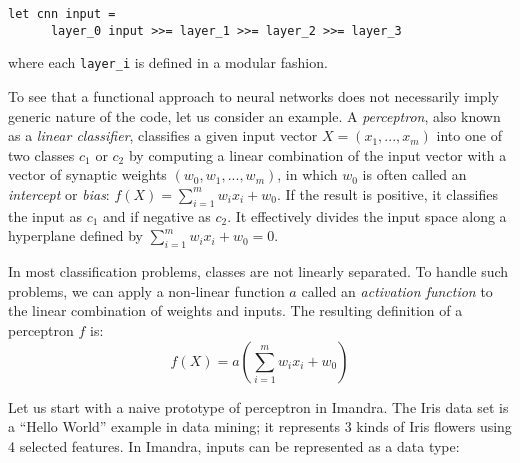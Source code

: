 \documentclass[runningheads]{llncs}
\begin{document}
\begin{lstlisting}[language=caml, label={lst:model}]
  let cnn input =
      layer_0 input >>= layer_1 >>= layer_2 >>= layer_3
\end{lstlisting}

where each \lstinline?layer_i? is defined in a modular fashion. 


 To see that a functional approach to neural networks does not necessarily imply generic nature of the code, 
let us consider an example. 
A \emph{perceptron}, also known as a \emph{linear classifier}, classifies a given input vector $X = (x_1, ..., x_m)$ into one of two classes $c_1$ or $c_2$ by computing a linear combination of the input vector with a vector of synaptic weights $(w_0, w_1, ..., w_m)$, in which $w_0$ is often called an \emph{intercept} or \emph{bias}: 
	$ f(X) = 	\sum_{i=1}^{m}w_ix_i + w_0 $.
If the result is positive, it classifies the input as $c_1$ and if negative as $c_2$. It effectively divides the input space along a hyperplane defined by
$\sum_{i=1}^{m}w_ix_i + w_0 = 0$. 



In most classification problems, classes are not linearly separated. To handle such problems, we can apply a non-linear function $a$ called an \textit{activation function} to the linear combination of weights and inputs. The resulting definition of a perceptron $f$ is:
\begin{equation}\label{eq:perceptron}
	f(X) = a\left(\sum_{i=1}^{m}w_ix_i + w_0\right)
      \end{equation}

     Let us start with a naive prototype of perceptron in Imandra.  The Iris data set is a ``Hello World'' example in data mining; it represents 3 kinds of Iris flowers using 4 selected features.
      In Imandra, inputs can be represented as a data type: %
\end{document}

